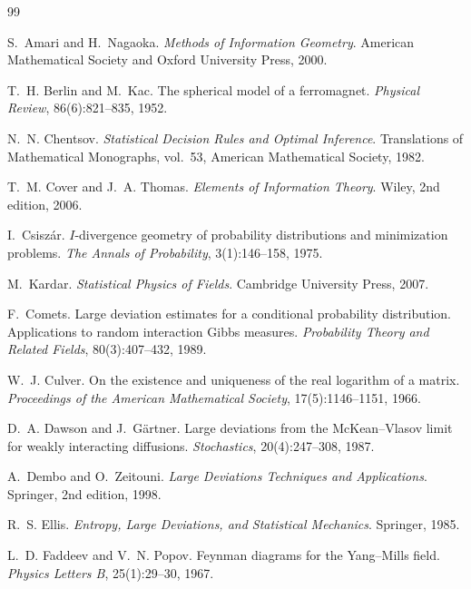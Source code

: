 \documentclass[11pt]{article}
\theoremstyle{plain}
\theoremstyle{definition}
\begin{document}
\begin{thebibliography}{99}

S.~Amari and H.~Nagaoka.
\newblock \emph{Methods of Information Geometry}.
\newblock American Mathematical Society and Oxford University Press, 2000.

T.~H. Berlin and M.~Kac.
\newblock The spherical model of a ferromagnet.
\newblock \emph{Physical Review}, 86(6):821--835, 1952.

N.~N. Chentsov.
\newblock \emph{Statistical Decision Rules and Optimal Inference}.
\newblock Translations of Mathematical Monographs, vol.~53, American Mathematical
  Society, 1982.

T.~M. Cover and J.~A. Thomas.
\newblock \emph{Elements of Information Theory}.
\newblock Wiley, 2nd edition, 2006.

I.~Csisz\'ar.
\newblock $I$-divergence geometry of probability distributions and minimization problems.
\newblock \emph{The Annals of Probability}, 3(1):146--158, 1975.

M.~Kardar.
\newblock \emph{Statistical Physics of Fields}.
\newblock Cambridge University Press, 2007.

F.~Comets.
\newblock Large deviation estimates for a conditional probability distribution.
  Applications to random interaction Gibbs measures.
\newblock \emph{Probability Theory and Related Fields}, 80(3):407--432, 1989.

W.~J. Culver.
\newblock On the existence and uniqueness of the real logarithm of a matrix.
\newblock \emph{Proceedings of the American Mathematical Society}, 17(5):1146--1151, 1966.

D.~A. Dawson and J.~G\"artner.
\newblock Large deviations from the McKean--Vlasov limit for weakly interacting
  diffusions.
\newblock \emph{Stochastics}, 20(4):247--308, 1987.

A.~Dembo and O.~Zeitouni.
\newblock \emph{Large Deviations Techniques and Applications}.
\newblock Springer, 2nd edition, 1998.

R.~S. Ellis.
\newblock \emph{Entropy, Large Deviations, and Statistical Mechanics}.
\newblock Springer, 1985.

L.~D. Faddeev and V.~N. Popov.
\newblock Feynman diagrams for the Yang--Mills field.
\newblock \emph{Physics Letters B}, 25(1):29--30, 1967.


\end{thebibliography}
\end{document}
